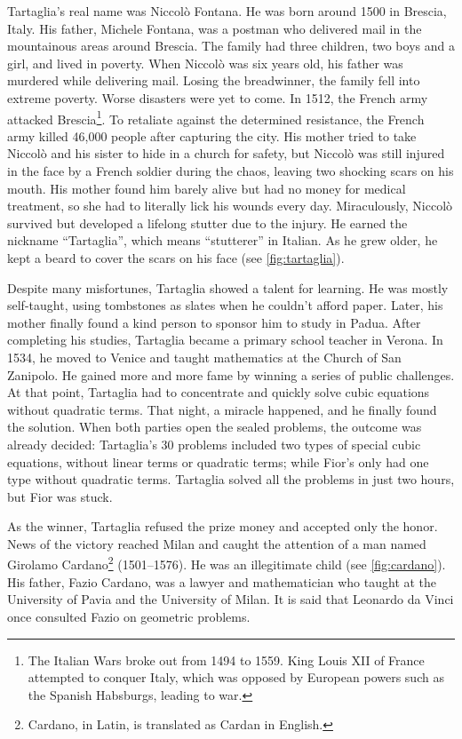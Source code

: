 \documentclass[b5paper]{article}
\begin{document}
Tartaglia's real name was Niccolò Fontana. He was born around 1500 in Brescia, Italy. His father, Michele Fontana, was a postman who delivered mail in the mountainous areas around Brescia. The family had three children, two boys and a girl, and lived in poverty. When Niccolò was six years old, his father was murdered while delivering mail. Losing the breadwinner, the family fell into extreme poverty. Worse disasters were yet to come. In 1512, the French army attacked Brescia\footnote{The Italian Wars broke out from 1494 to 1559. King Louis XII of France attempted to conquer Italy, which was opposed by European powers such as the Spanish Habsburgs, leading to war.}. To retaliate against the determined resistance, the French army killed 46,000 people after capturing the city. His mother tried to take Niccolò and his sister to hide in a church for safety, but Niccolò was still injured in the face by a French soldier during the chaos, leaving two shocking scars on his mouth. His mother found him barely alive but had no money for medical treatment, so she had to literally lick his wounds every day. Miraculously, Niccolò survived but developed a lifelong stutter due to the injury. He earned the nickname \enquote{Tartaglia}, which means \enquote{stutterer} in Italian. As he grew older, he kept a beard to cover the scars on his face (see \cref{fig:tartaglia}).

Despite many misfortunes, Tartaglia showed a talent for learning. He was mostly self-taught, using tombstones as slates when he couldn't afford paper. Later, his mother finally found a kind person to sponsor him to study in Padua. After completing his studies, Tartaglia became a primary school teacher in Verona. In 1534, he moved to Venice and taught mathematics at the Church of San Zanipolo. He gained more and more fame by winning a series of public challenges\cite{MacTour-Tartaglia}. At that point, Tartaglia had to concentrate and quickly solve cubic equations without quadratic terms. That night, a miracle happened, and he finally found the solution. When both parties open the sealed problems, the outcome was already decided: Tartaglia's 30 problems included two types of special cubic equations, without linear terms or quadratic terms; while Fior's only had one type without quadratic terms. Tartaglia solved all the problems in just two hours, but Fior was stuck.

As the winner, Tartaglia refused the prize money and accepted only the honor. News of the victory reached Milan and caught the attention of a man named Girolamo Cardano\footnote{Cardano, in Latin, is translated as Cardan in English.} (1501–1576). He was an illegitimate child (see \cref{fig:cardano}). His father, Fazio Cardano, was a lawyer and mathematician who taught at the University of Pavia and the University of Milan. It is said that Leonardo da Vinci once consulted Fazio on geometric problems.
\end{document}
